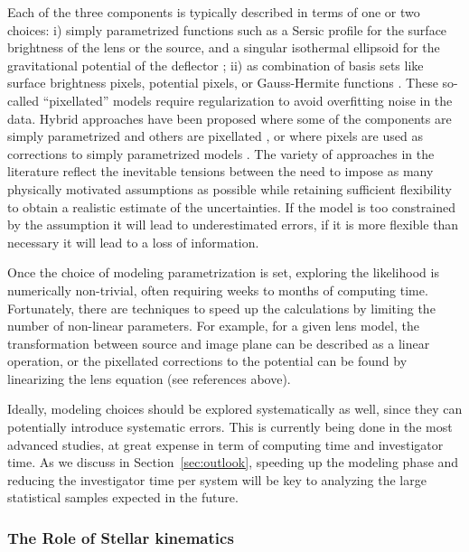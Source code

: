 Each of the three components is typically described in terms of one or
two choices: i) simply parametrized functions such as a Sersic profile
for the surface brightness of the lens or the source, and a singular
isothermal ellipsoid for the gravitational potential of the deflector
\citep{Kee11}; ii) as combination of basis sets like surface brightness
pixels, potential pixels, or Gauss-Hermite functions
\citep[e.g.][]{Col08, BirrerEtal2015, Nig++15}. These so-called
``pixellated'' models require regularization to avoid overfitting
noise in the data. Hybrid approaches have been proposed where some of
the components are simply parametrized and others are pixellated
\citep{W+D03,T+K04,Suy++06}, or where pixels are used as corrections to simply
parametrized models \citep{Koo05,V+K09,S+H10,Suy++10}. The variety of
approaches in the literature reflect the inevitable tensions between
the need to impose as many physically motivated assumptions as
possible while retaining sufficient flexibility to obtain a realistic
estimate of the uncertainties. If the model is too constrained by the
assumption it will lead to underestimated errors, if it is more
flexible than necessary it will lead to a loss of information.

Once the choice of modeling parametrization is set, exploring the
likelihood is numerically non-trivial, often requiring weeks to months
of computing time. Fortunately, there are techniques to speed up the
calculations by limiting the number of non-linear parameters. For
example, for a given lens model, the transformation between source and
image plane can be described as a linear operation, or the pixellated
corrections to the potential can be found by linearizing the lens
equation (see references above). 

Ideally, modeling choices should be explored systematically as well,
since they can potentially introduce systematic errors. This is
currently being done in the most advanced studies, at great expense in
term of computing time and investigator time. As we discuss in
Section~\ref{sec:outlook}, speeding up the modeling phase and reducing
the investigator time per system will be key to analyzing the large
statistical samples expected in the future.


\subsubsection{The Role of Stellar kinematics}

